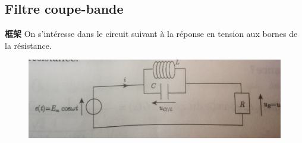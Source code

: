 \documentclass[12pt]{book}
\theoremstyle{definition}\newtheorem{dfn}{Définition}[chapter]
\theoremstyle{plain}\newtheorem{thm}{Théorème}[chapter]
\theoremstyle{plain}\newtheorem{prp}{Proposition}[chapter]
\theoremstyle{plain}\newtheorem{lem}{\bf Lemme}[chapter]
\theoremstyle{plain}\newtheorem{axm}{\bf Axiome}[chapter]
\theoremstyle{plain}\newtheorem{lmm}{\bf Lemme}[chapter]
\theoremstyle{plain}\newtheorem{cor}{\bf Corollaire}[chapter]
\theoremstyle{remark}\newtheorem{rem}{Remarque}[chapter]
\begin{document}
\subsection{Filtre coupe-bande}
\begin{framed}{\textbf{框架}}
	On s'intéresse dans le circuit suivant à la réponse en tension aux bornes de la résistance.
\end{framed}
\begin{figure}[H]
	\centering
	\includegraphics[scale=0.16]{image//Filtrage//8}
\end{figure}
\end{document}
